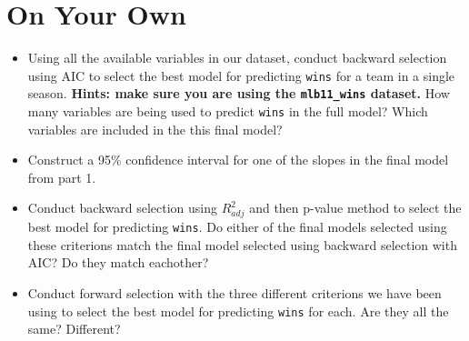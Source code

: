 \documentclass[]{book}
\theoremstyle{definition}
\theoremstyle{definition}
\theoremstyle{definition}
\theoremstyle{remark}
\begin{document}
\hypertarget{on-your-own-8}{%
\section{On Your Own}\label{on-your-own-8}}

\begin{itemize}
\item
  Using all the available variables in our dataset, conduct backward
  selection using AIC to select the best model for predicting
  \texttt{wins} for a team in a single season. \textbf{Hints: make sure
  you are using the \texttt{mlb11\_wins} dataset.} How many variables
  are being used to predict \texttt{wins} in the full model? Which
  variables are included in the this final model?
\item
  Construct a 95\% confidence interval for one of the slopes in the
  final model from part 1.
\item
  Conduct backward selection using \(R^2_{adj}\) and then p-value method
  to select the best model for predicting \texttt{wins}. Do either of
  the final models selected using these criterions match the final model
  selected using backward selection with AIC? Do they match eachother?
\item
  Conduct forward selection with the three different criterions we have
  been using to select the best model for predicting \texttt{wins} for
  each. Are they all the same? Different?
\end{itemize}


\end{document}
